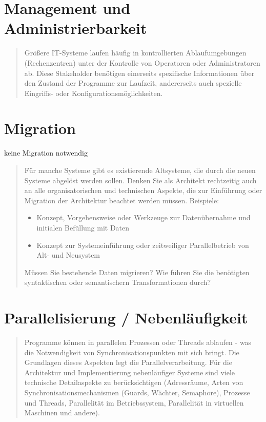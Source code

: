 \section{Management und Administrierbarkeit}

\begin{quote}
	Größere IT-Systeme laufen häufig in kontrollierten Ablaufumgebungen (Rechenzentren) unter der Kontrolle von Operatoren oder Administratoren ab. Diese Stakeholder benötigen einerseits spezifische Informationen über den Zustand der Programme zur Laufzeit, andererseits auch spezielle Eingriffs- oder Konfigurationsmöglichkeiten.
\end{quote}

\section{Migration}

keine Migration notwendig

\begin{quote}
	Für manche Systeme gibt es existierende Altsysteme, die durch die neuen Systeme abgelöst werden sollen. Denken Sie als Architekt rechtzeitig auch an alle organisatorischen und technischen Aspekte, die zur Einführung oder Migration der Architektur beachtet werden müssen.
	Beispiele:
	\begin{itemize}
		\item Konzept, Vorgehensweise oder Werkzeuge zur Datenübernahme und initialen Befüllung mit Daten
		\item Konzept zur Systemeinführung oder zeitweiliger Parallelbetrieb von Alt- und Neusystem
	\end{itemize}
	Müssen Sie bestehende Daten migrieren? Wie führen Sie die benötigten syntaktischen oder semantischern Transformationen durch?
\end{quote}

\section{Parallelisierung / Nebenläufigkeit}

\begin{quote}
	Programme können in parallelen Prozessen oder Threads ablaufen - was die Notwendigkeit von Synchronisationspunkten mit sich bringt. Die Grundlagen dieses Aspekten legt die Parallelverarbeitung. Für die Architektur und Implementierung nebenläufiger Systeme sind viele technische Detailaspekte zu berücksichtigen (Adressräume, Arten von Synchronisationsmechanismen (Guards, Wächter, Semaphore), Prozesse und Threads, Parallelität im Betriebssystem, Parallelität in virtuellen Maschinen und andere).
\end{quote}

